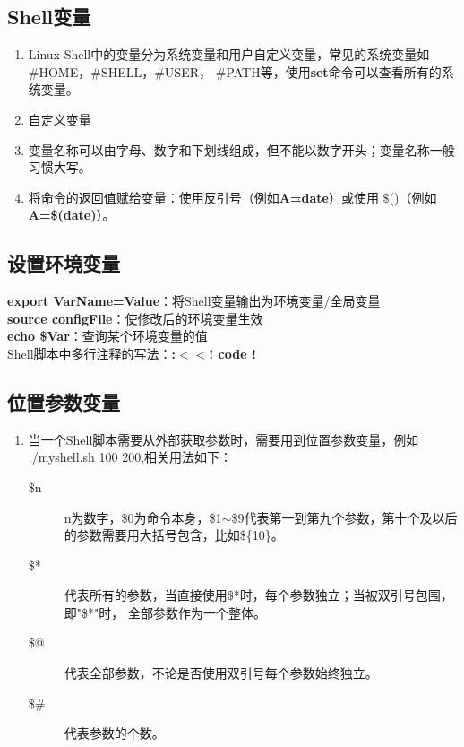 \documentclass[11pt]{article}
\begin{document}
\subsection{Shell变量}
\begin{enumerate}
\item Linux Shell中的变量分为系统变量和用户自定义变量，常见的系统变量如\#HOME，\#SHELL，\#USER，
\#PATH等，使用\textbf{set}命令可以查看所有的系统变量。
\item 自定义变量
\item 变量名称可以由字母、数字和下划线组成，但不能以数字开头；变量名称一般习惯大写。
\item 将命令的返回值赋给变量：使用反引号（例如\textbf{A=$\grave{}$date$\grave{}$}）或使用
$\$$()（例如\textbf{A=\$(date)}）。
\end{enumerate}

\subsection{设置环境变量}
\textbf{export VarName=Value}：将Shell变量输出为环境变量/全局变量 \\
\textbf{source configFile}：使修改后的环境变量生效 \\
\textbf{echo \$Var}：查询某个环境变量的值 \\
Shell脚本中多行注释的写法：\textbf{:$<<$! code !}

\subsection{位置参数变量}
\begin{enumerate}
    \item 当一个Shell脚本需要从外部获取参数时，需要用到位置参数变量，例如 \\./myshell.sh 100 200,相关用法如下：
    \begin{description}
        \item[\$n] n为数字，\$0为命令本身，\$1$\sim$\$9代表第一到第九个参数，第十个及以后
        的参数需要用大括号包含，比如\$\{10\}。
        \item[\$*] 代表所有的参数，当直接使用\$*时，每个参数独立；当被双引号包围，即"\$*"时，
        全部参数作为一个整体。
        \item[\$@] 代表全部参数，不论是否使用双引号每个参数始终独立。
        \item[\$\#] 代表参数的个数。
    \end{description}
\end{enumerate}
\end{document}

